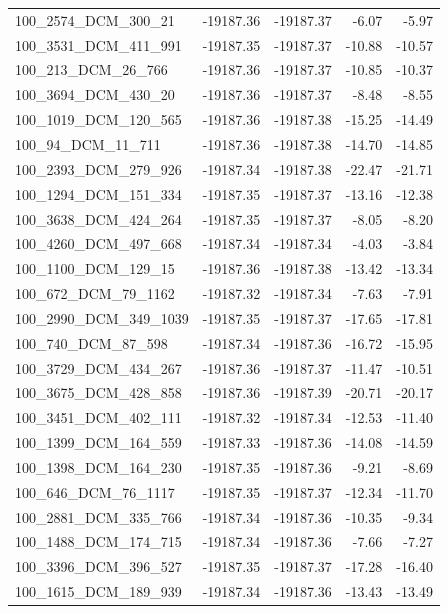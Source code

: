 \documentclass[journal=jacsat,manuscript=article]{achemso}
\begin{document}
\begin{table}[b!]
\begin{tabular}{lrrrr}
100\_2574\_DCM\_300\_21   & -19187.36 & -19187.37 &   -6.07 &  -5.97 \\
100\_3531\_DCM\_411\_991  & -19187.35 & -19187.37 &  -10.88 & -10.57 \\
100\_213\_DCM\_26\_766    & -19187.36 & -19187.37 &  -10.85 & -10.37 \\
100\_3694\_DCM\_430\_20   & -19187.36 & -19187.37 &   -8.48 &  -8.55 \\
100\_1019\_DCM\_120\_565  & -19187.36 & -19187.38 &  -15.25 & -14.49 \\
100\_94\_DCM\_11\_711     & -19187.36 & -19187.38 &  -14.70 & -14.85 \\
100\_2393\_DCM\_279\_926  & -19187.34 & -19187.38 &  -22.47 & -21.71 \\
100\_1294\_DCM\_151\_334  & -19187.35 & -19187.37 &  -13.16 & -12.38 \\
100\_3638\_DCM\_424\_264  & -19187.35 & -19187.37 &   -8.05 &  -8.20 \\
100\_4260\_DCM\_497\_668  & -19187.34 & -19187.34 &   -4.03 &  -3.84 \\
100\_1100\_DCM\_129\_15   & -19187.36 & -19187.38 &  -13.42 & -13.34 \\
100\_672\_DCM\_79\_1162   & -19187.32 & -19187.34 &   -7.63 &  -7.91 \\
100\_2990\_DCM\_349\_1039 & -19187.35 & -19187.37 &  -17.65 & -17.81 \\
100\_740\_DCM\_87\_598    & -19187.34 & -19187.36 &  -16.72 & -15.95 \\
100\_3729\_DCM\_434\_267  & -19187.36 & -19187.37 &  -11.47 & -10.51 \\
100\_3675\_DCM\_428\_858  & -19187.36 & -19187.39 &  -20.71 & -20.17 \\
100\_3451\_DCM\_402\_111  & -19187.32 & -19187.34 &  -12.53 & -11.40 \\
100\_1399\_DCM\_164\_559  & -19187.33 & -19187.36 &  -14.08 & -14.59 \\
100\_1398\_DCM\_164\_230  & -19187.35 & -19187.36 &   -9.21 &  -8.69 \\
100\_646\_DCM\_76\_1117   & -19187.35 & -19187.37 &  -12.34 & -11.70 \\
100\_2881\_DCM\_335\_766  & -19187.34 & -19187.36 &  -10.35 &  -9.34 \\
100\_1488\_DCM\_174\_715  & -19187.34 & -19187.36 &   -7.66 &  -7.27 \\
100\_3396\_DCM\_396\_527  & -19187.35 & -19187.37 &  -17.28 & -16.40 \\
100\_1615\_DCM\_189\_939  & -19187.34 & -19187.36 &  -13.43 & -13.49 \\

\end{tabular}
\end{table}
\end{document}
